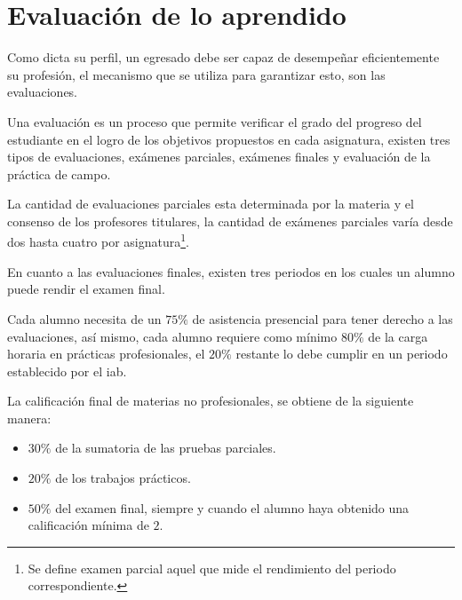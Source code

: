\section{Evaluación de lo aprendido}
\label{sec:problema_evaluacion}



Como dicta su perfil, un egresado debe ser capaz de desempeñar eficientemente su
profesión, el mecanismo que se utiliza para garantizar esto, son las
evaluaciones.

Una evaluación es un proceso que permite verificar el grado del progreso del
estudiante en el logro de los objetivos propuestos en cada
asignatura\cite{iab:est_enfemeria}, existen tres tipos de evaluaciones, exámenes
parciales, exámenes finales y evaluación de la práctica de campo.

La cantidad de evaluaciones parciales esta determinada por la materia y el
consenso de los profesores titulares\cite{iab:est_enfemeria}, la cantidad de
exámenes parciales varía desde dos hasta cuatro por asignatura\footnote{Se
    define examen parcial aquel que mide el rendimiento del periodo
    correspondiente\cite{iab:est_enfemeria}.}.

En cuanto a las evaluaciones finales, existen tres periodos en los cuales un
alumno puede rendir el examen final.

Cada alumno necesita de un $75\%$ de asistencia presencial para tener derecho a
las evaluaciones, así mismo, cada alumno requiere como mínimo $80\%$ de la carga
horaria en prácticas profesionales, el $20\%$ restante lo debe cumplir en un
periodo establecido por el \Gls{iab}.


La calificación final de materias no profesionales, se obtiene de la siguiente
manera\cite{iab:est_enfemeria}:

\begin{itemize}
    \item $30\%$ de la sumatoria de las pruebas parciales.
    \item $20\%$ de los trabajos prácticos.
    \item $50\%$ del examen final, siempre y cuando el alumno haya obtenido
        una calificación mínima de $2$.
\end{itemize}

